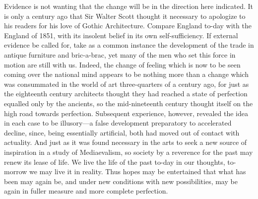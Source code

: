 \documentclass{book}
\begin{document}
Evidence is not wanting that the change will be in the direction here indicated. It is only a century ago that Sir Walter Scott thought it necessary to apologize to his readers for his love of Gothic Architecture. Compare England to-day with the England of 1851, with its insolent belief in its own self-sufficiency. If external evidence be called for, take as a common instance the development of the trade in antique furniture and bric-a-brac, yet many of the men who set this force in motion are still with us. Indeed, the change of feeling which is now to be seen coming over the national mind appears to be nothing more than a change which was consummated in the world of art three-quarters of a century ago, for just as the eighteenth century architects thought they had reached a state of perfection equalled only by the ancients, so the mid-nineteenth century thought itself on the high road towards perfection. Subsequent experience, however, revealed the idea in each case to be illusory—a false development preparatory to accelerated decline, since, being essentially artificial, both had moved out of contact with actuality. And just as it was found necessary in the arts to seek a new source of inspiration in a study of Mediaevalism, so society by a reverence for the past may renew its lease of life. We live the life of the past to-day in our thoughts, to-morrow we may live it in reality. Thus hopes may be entertained that what has been may again be, and under new conditions with new possibilities, may be again in fuller measure and more complete perfection.
\end{document}
